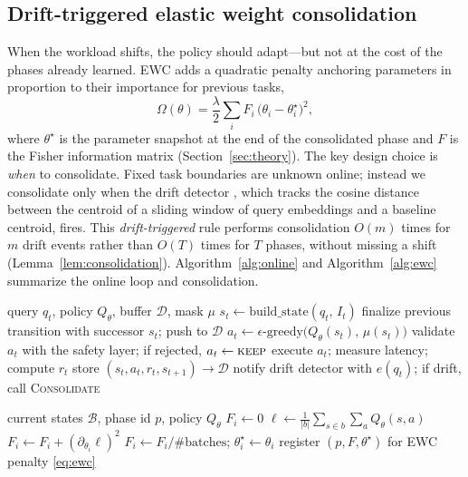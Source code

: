 \subsection{Drift-triggered elastic weight consolidation}
When the workload shifts, the policy should adapt---but not at the cost of the
phases already learned. EWC \citep{kirkpatrick2017ewc} adds a quadratic penalty
anchoring parameters in proportion to their importance for previous tasks,
\begin{equation}
  \Omega(\theta) = \frac{\lambda}{2}\sum_i F_i\,\big(\theta_i - \theta^\star_i\big)^2,
  \label{eq:ewc}
\end{equation}
where \(\theta^\star\) is the parameter snapshot at the end of the consolidated
phase and \(F\) is the Fisher information matrix (Section~\ref{sec:theory}). The
key design choice is \emph{when} to consolidate. Fixed task boundaries are
unknown online; instead we consolidate only when the drift detector
\citep{gama2014drift}, which tracks the cosine distance between the centroid of
a sliding window of query embeddings and a baseline centroid, fires. This
\emph{drift-triggered} rule performs consolidation \(O(m)\) times for \(m\) drift
events rather than \(O(T)\) times for \(T\) phases, without missing a shift
(Lemma~\ref{lem:consolidation}). Algorithm~\ref{alg:online} and
Algorithm~\ref{alg:ewc} summarize the online loop and consolidation.

\begin{algorithm}[t]
\caption{CLDB online step (one query)}
\label{alg:online}
\begin{algorithmic}[1]
\Require query $q_t$, policy $Q_\theta$, buffer $\mathcal{D}$, mask $\mu$
\State $s_t \gets \mathrm{build\_state}(q_t,\, I_t)$ 
\State finalize previous transition with successor $s_t$; push to $\mathcal{D}$
\State $a_t \gets \epsilon\text{-greedy}\big(Q_\theta(s_t),\,\mu(s_t)\big)$
\State validate $a_t$ with the safety layer; if rejected, $a_t\gets\textsc{keep}$
\State execute $a_t$; measure latency; compute $r_t$ 
\State store $(s_t,a_t,r_t,s_{t+1})\to\mathcal{D}$
\State notify drift detector with $e(q_t)$; if drift, call \textsc{Consolidate}
\end{algorithmic}
\end{algorithm}

\begin{algorithm}[t]
\caption{Drift-triggered consolidation}
\label{alg:ewc}
\begin{algorithmic}[1]
\Require current states $\mathcal{B}$, phase id $p$, policy $Q_\theta$
 $F_i \gets 0$ \EndFor
{}
  \State $\ell \gets \frac{1}{|b|}\sum_{s\in b}\sum_{a} Q_\theta(s,a)$
  \State $F_i \gets F_i + (\partial_{\theta_i}\ell)^2$
\EndFor
\State $F_i \gets F_i / \#\text{batches}$; \;
$\theta^\star_i \gets \theta_i$ 
\State register $(p, F, \theta^\star)$ for EWC penalty \eqref{eq:ewc}
\end{algorithmic}
\end{algorithm}

